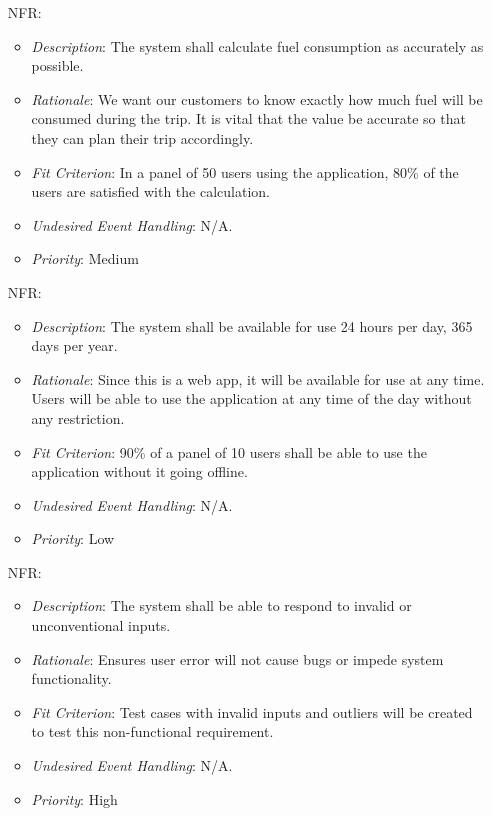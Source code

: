 \documentclass[12pt]{article}
\newcounter{nfrnum} %
\begin{document}
\begin{itemize}
\item[NFR\refstepcounter{nfrnum}\thenfrnum \label{NFR_9}:] 
\begin{itemize}
  \item \textit{Description}: The system shall calculate fuel consumption as accurately as possible.
  \item \textit{Rationale}: We want our customers to know exactly how much fuel will be consumed during the trip. It is vital that the value be accurate so that they can plan their trip accordingly.
  \item \textit{Fit Criterion}: In a panel of 50 users using the application, 80\% of the users are satisfied with the calculation.
  \item \textit{Undesired Event Handling}: N/A.
  \item \textit{Priority}: Medium
\end{itemize}

\item[NFR\refstepcounter{nfrnum}\thenfrnum \label{NFR_10}:] 
\begin{itemize}
  \item \textit{Description}: The system shall be available for use 24 hours per day, 365 days per year.
  \item \textit{Rationale}: Since this is a web app, it will be available for use at any time. Users will be able to use the application at any time of the day without any restriction.
  \item \textit{Fit Criterion}: 90\% of a panel of 10 users shall be able to use the application without it going offline.
  \item \textit{Undesired Event Handling}: N/A.
  \item \textit{Priority}: Low
\end{itemize}

\item[NFR\refstepcounter{nfrnum}\thenfrnum \label{NFR_11}:] 
\begin{itemize}
  \item \textit{Description}: The system shall be able to respond to invalid or unconventional inputs.  
  \item \textit{Rationale}: Ensures user error will not cause bugs or impede system functionality. 
  \item \textit{Fit Criterion}: Test cases with invalid inputs and outliers will be created to test this non-functional requirement.  
  \item \textit{Undesired Event Handling}: N/A. 
  \item \textit{Priority}: High
\end{itemize}


\end{itemize}
\end{document}
